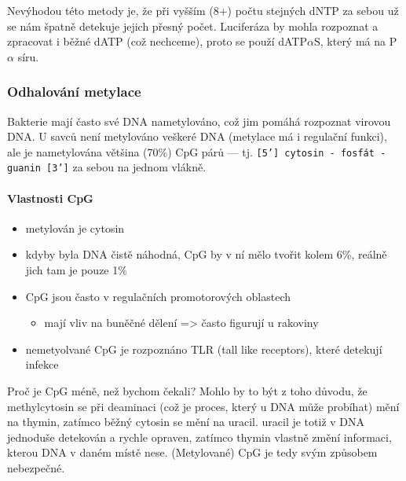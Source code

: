 \documentclass[DIV=8]{scrreprt}
\newcommand{\inlinecode}{\texttt}
\begin{document}
Nevýhodou této metody je, že při vyšším (8+) počtu stejných dNTP za sebou už se nám špatně detekuje jejich přesný počet. Luciferáza by mohla rozpoznat a zpracovat i běžné dATP (což nechceme), proto se použí dATP\(\alpha\)S, který má na P\(\alpha\) síru.

\subsubsection{Odhalování metylace} \label{Odhalování metylace}


Bakterie mají často své DNA nametylováno, což jim pomáhá rozpoznat virovou DNA. U savců není metylováno veškeré DNA (metylace má i regulační funkci), ale je nametylována většina (70\%) CpG párů --- tj. \inlinecode{[5'] cytosin - fosfát - guanin [3']} za sebou na jednom vlákně.

\paragraph{Vlastnosti CpG}
\begin{itemize}[nosep]
    \item metylován je cytosin
    \item kdyby byla DNA čistě náhodná, CpG by v ní mělo tvořit kolem 6\%, reálně jich tam je pouze 1\%
    \item CpG jsou často v regulačních promotorových oblastech
\begin{itemize}[nosep]
    \item mají vliv na buněčné dělení => často figurují u rakoviny
\end{itemize}

    \item nemetyolvané CpG je rozpoznáno TLR (tall like receptors), které detekují infekce
\end{itemize}



Proč je CpG méně, než bychom čekali? Mohlo by to být z toho důvodu, že methylcytosin se při deaminaci (což je proces, který u DNA může probíhat) mění na thymin, zatímco běžný cytosin se mění na uracil. uracil je totiž v DNA jednoduše detekován a rychle opraven, zatímco thymin vlastně změní informaci, kterou DNA v daném místě nese. (Metylované) CpG je tedy svým způsobem nebezpečné.
\end{document}
